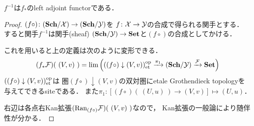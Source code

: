 \begin{Prop}[\cite{SP} 00XF]
    $f^{-1}$は$f_*$のleft adjoint functorである．
\end{Prop}
\begin{proof}
    $(f \circ) \colon (\mathbf{Sch}/\mathcal{X}) \to (\mathbf{Sch}/\mathcal{Y})$を
    $f \colon \mathcal{X} \to \mathcal{Y}$の合成で得られる関手とする．
    すると関手$f^{-1}$は関手(sheaf) $(\mathbf{Sch}/\mathcal{Y}) \to \mathbf{Set}$と$(f \circ)$の合成としてかける．

    これを用いると上の定義は次のように変形できる．
    \[
        (f_*\mathcal{F})(\ (V,v)\ )
        =\operatorname*{lim}\Big(  ((f \circ) \downarrow (V,v))_{\mathrm{et}}^{\mathrm{op}} \xrightarrow{\pi_1} (\mathbf{Sch}/\mathcal{Y}) \xrightarrow{\mathcal{F}} \mathbf{Set} \Big)
    \]
    $((f \circ) \downarrow (V,v))_{\mathrm{et}}^{\mathrm{op}}$は
    圏$(f \circ) \downarrow (V,v)$の双対圏にetale Grothendieck topologyを与えてできるsiteである．
    また$\pi_1 \colon [(f \circ)(\ (U,u)\ ) \to (V,v)] \mapsto (U,u)$．
    
    右辺は各点右Kan拡張$(\mathrm{Ran}_{(f \circ)} \mathcal{F})(\ (V,v)\ )$なので，
    Kan拡張の一般論により随伴性が分かる．
\end{proof}

